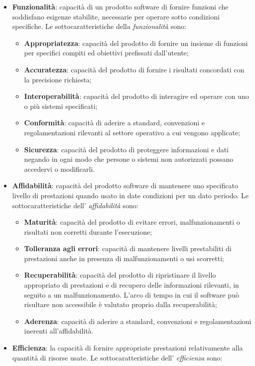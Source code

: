 \begin{itemize}
\item \textbf{Funzionalità}: capacità di un prodotto software di fornire funzioni che soddisfano esigenze stabilite, necessarie per operare sotto condizioni specifiche. Le sottocaratteristiche della \textit{funzionalità} sono:
	\begin{itemize}
	\item \textbf{Appropriatezza}: capacità del prodotto di fornire un insieme di funzioni per specifici compiti ed obiettivi prefissati dall'utente;
	\item \textbf{Accuratezza}: capacità del prodotto di fornire i risultati concordati con la precisione richiesta;
	\item \textbf{Interoperabilità}: capacità del prodotto di interagire ed operare con uno o più sistemi specificati;
	\item \textbf{Conformità}: capacità di aderire a standard, convenzioni e regolamentazioni rilevanti al settore operativo a cui vengono applicate;
	\item \textbf{Sicurezza}: capacità del prodotto di proteggere informazioni e dati negando in ogni modo che persone o sistemi non autorizzati possano accedervi o modificarli.
	\end{itemize}
\item \textbf{Affidabilità}: capacità del prodotto software di mantenere uno specificato livello di prestazioni quando usato in date condizioni per un dato periodo. Le sottocaratteristiche dell' \textit{affidabilità} sono:
	\begin{itemize}
	\item \textbf{Maturità}: capacità del prodotto di evitare errori, malfunzionamenti o risultati non corretti durante l'esecuzione;
	\item \textbf{Tolleranza agli errori}: capacità di mantenere livelli prestabiliti di prestazioni anche in presenza di malfunzionamenti o usi scorretti;
	\item \textbf{Recuperabilità}: capacità del prodotto di ripristinare il livello appropriato di prestazioni e di recupero delle informazioni rilevanti, in seguito a un malfunzionamento. L'arco di tempo in cui il software può risultare non accessibile è valutato proprio dalla recuperabilità;
	\item \textbf{Aderenza}: capacità di aderire a standard, convenzioni e regolamentazioni inerenti all'affidabilità.
	\end{itemize}
\item \textbf{Efficienza}: la capacità di fornire appropriate prestazioni relativamente alla quantità di risorse usate. Le sottocaratteristiche dell' \textit{efficienza} sono:

\end{itemize}
